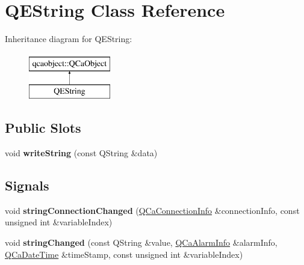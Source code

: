 \hypertarget{classQEString}{
\section{QEString Class Reference}
\label{classQEString}
}
Inheritance diagram for QEString:\begin{figure}[H]
\begin{center}
\leavevmode
\includegraphics[height=2.000000cm]{classQEString}
\end{center}
\end{figure}
\subsection*{Public Slots}
\begin{DoxyCompactItemize}
\item 
\hypertarget{classQEString_aeb89cdd6e23861198d3d7bfecfa45d16}{
void {\bfseries writeString} (const QString \&data)}
\label{classQEString_aeb89cdd6e23861198d3d7bfecfa45d16}

\end{DoxyCompactItemize}
\subsection*{Signals}
\begin{DoxyCompactItemize}
\item 
\hypertarget{classQEString_abdda6e268cd8ead8a4a9ba374fc623a3}{
void {\bfseries stringConnectionChanged} (\hyperlink{classQCaConnectionInfo}{QCaConnectionInfo} \&connectionInfo, const unsigned int \&variableIndex)}
\label{classQEString_abdda6e268cd8ead8a4a9ba374fc623a3}

\item 
\hypertarget{classQEString_a70a333ffcf04d0051800db83da176290}{
void {\bfseries stringChanged} (const QString \&value, \hyperlink{classQCaAlarmInfo}{QCaAlarmInfo} \&alarmInfo, \hyperlink{classQCaDateTime}{QCaDateTime} \&timeStamp, const unsigned int \&variableIndex)}
\label{classQEString_a70a333ffcf04d0051800db83da176290}

\end{DoxyCompactItemize}
